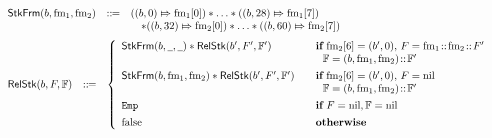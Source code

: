\begin{figure}[!t]
    \centering
    \small
    \[
        \begin{array}{l}
            \hspace*{-0.15em}
            \begin{array}{lcl}
                \RelStkFm{\block}{\fm_1}{\fm_2} & \define & 
                (\relmsto{(\block, 0)}{\fm_1[0]}) \sepstar \dots \sepstar 
                (\relmsto{(\block, 28)}{\fm_1[7]}) \\
                & & \quad \sepstar 
                (\relmsto{(\block, 32)}{\fm_2[0]}) \sepstar 
                \dots \sepstar
                (\relmsto{(\block, 60)}{\fm_2[7]})
            \end{array} \\
            \\[-5pt]
            \hspace*{-0.15em}
            \begin{array}{lcl}
                \RelStk{\block}{\Wstack}{\hWstk} & \define & 
                \left\{
                    \begin{array}{ll}
                        \RelStkFm{\block}{\notCare}{\notCare} \sepstar
                        \RelStk{\block'}{\Wstack'}{\hWstk'} & 
                            \quad \cif \  
                            \fm_2[6] = (\block', 0), \, \Wstack = \fm_1 \stCons \fm_2 \stCons \Wstack' \\
                            & \quad \ \ \hWstk = (\block, \fm_1, \fm_2) \stCons \hWstk' \\
                            \\[-8pt]
                        \RelStkFm{\block}{\fm_1}{\fm_2} \sepstar 
                        \RelStk{\block'}{\Wstack'}{\hWstk'} & 
                            \quad \cif \ 
                            \fm_2[6] = (\block', 0), \, \Wstack = \nil \\
                            & \quad \ \ \hWstk = (\block, \fm_1, \fm_2) \stCons \hWstk' \\
                            \\[-8pt]
                        \empAst & \quad \cif \ \Wstack = \nil, \hWstk = \nil \\
                            \\[-8pt]
                        \afalse & \quad \otherwise
                    \end{array}
                \right. 
            \end{array} \\

\end{array}\]
\end{figure}
